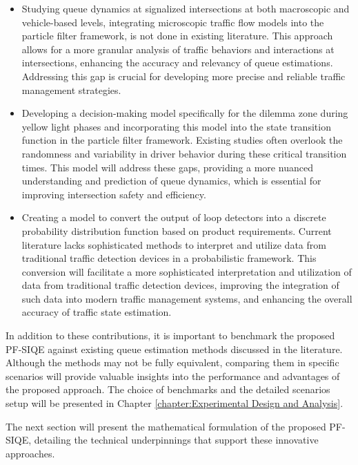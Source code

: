 \begin{itemize}
\item Studying queue dynamics at signalized intersections at both macroscopic and vehicle-based levels, integrating microscopic traffic flow models into the particle filter framework, is not done in existing literature. This approach allows for a more granular analysis of traffic behaviors and interactions at intersections, enhancing the accuracy and relevancy of queue estimations. Addressing this gap is crucial for developing more precise and reliable traffic management strategies.
\item Developing a decision-making model specifically for the dilemma zone during yellow light phases and incorporating this model into the state transition function in the particle filter framework. Existing studies often overlook the randomness and variability in driver behavior during these critical transition times. This model will address these gaps, providing a more nuanced understanding and prediction of queue dynamics, which is essential for improving intersection safety and efficiency.
\item Creating a model to convert the output of loop detectors into a discrete probability distribution function based on product requirements. Current literature lacks sophisticated methods to interpret and utilize data from traditional traffic detection devices in a probabilistic framework. This conversion will facilitate a more sophisticated interpretation and utilization of data from traditional traffic detection devices, improving the integration of such data into modern traffic management systems, and enhancing the overall accuracy of traffic state estimation.
\end{itemize}

In addition to these contributions, it is important to benchmark the proposed PF-SIQE against existing queue estimation methods discussed in the literature. Although the methods may not be fully equivalent, comparing them in specific scenarios will provide valuable insights into the performance and advantages of the proposed approach. The choice of benchmarks and the detailed scenarios setup will be presented in Chapter \ref{chapter:Experimental Design and Analysis}.

The next section will present the mathematical formulation of the proposed PF-SIQE, detailing the technical underpinnings that support these innovative approaches.